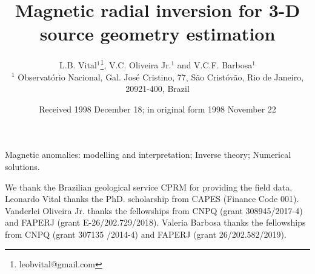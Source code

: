 \documentclass[extra,mreferee]{gji}
\title[Geophys.\ J.\ Int.: Magnetic radial inversion]
  {Magnetic radial inversion for 3-D source geometry estimation}
\author[L.B. Vital, V.C. Oliveira Jr. and V.C.F. Barbosa]
  {L.B. Vital$^1$\thanks{leobvital@gmail.com}, 
  V.C. Oliveira Jr.$^1$ and V.C.F. Barbosa$^1$\\
  $^1$ Observat{\'o}rio Nacional, Gal. Jos{\'e} Cristino, 77, São Crist{\'o}v{\~a}o,
  Rio de Janeiro, 20921-400, Brazil
  }
\date{Received 1998 December 18; in original form 1998 November 22}
\begin{document}
\label{firstpage}

\maketitle



\begin{keywords}
 Magnetic anomalies: modelling and interpretation; Inverse theory; Numerical solutions.
\end{keywords}











\begin{acknowledgments}
	We thank the Brazilian geological service CPRM for providing the field data. Leonardo Vital thanks the PhD. scholarship from CAPES (Finance Code 001). Vanderlei Oliveira Jr. thanks the fellowships from CNPQ (grant 308945/2017-4) and FAPERJ (grant E-26/202.729/2018).  Valeria Barbosa thanks the fellowships from CNPQ (grant 307135 /2014-4) and FAPERJ (grant 26/202.582/2019).
\end{acknowledgments}






\appendix

\label{lastpage}
\end{document}
